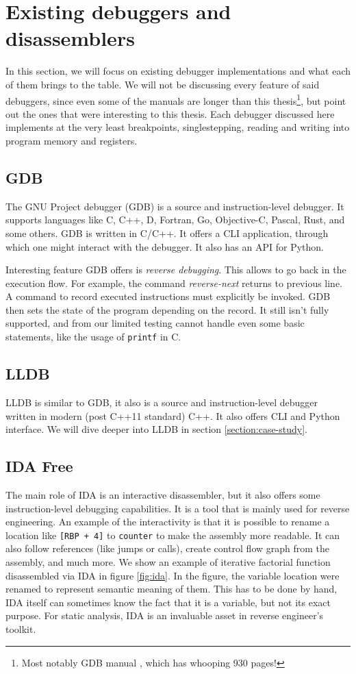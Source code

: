 \section{Existing debuggers and disassemblers}
In this section, we will focus on existing debugger implementations and what
each of them brings to the table. We will not be discussing every feature of
said debuggers, since even some of the manuals are longer than this
thesis\footnote{Most notably GDB manual \cite{gdb-manual}, which has whooping
930 pages!}, but point out the ones that were interesting to this thesis.
Each debugger discussed here implements at the very least breakpoints,
singlestepping, reading and writing into program memory and registers.

\subsection{GDB}
The GNU Project debugger (GDB) \cite{gdb-manual} is a source and instruction-level
debugger. It supports languages like C, C++, D, Fortran, Go, Objective-C,
Pascal, Rust, and some others. GDB is written in C/C++. It offers a CLI
application, through which one might interact with the debugger. It also
has an API for Python.

Interesting feature GDB offers is \textit{reverse debugging}. This allows to go
back in the execution flow. For example, the command \textit{reverse-next}
returns to previous line. A command to record executed instructions must
explicitly be invoked. GDB then sets the state of the program depending on the
record. It still isn't fully supported, and from our limited testing cannot
handle even some basic statements, like the usage of \texttt{printf} in C.

\subsection{LLDB}
LLDB is similar to GDB, it also is a source and instruction-level debugger
written in modern (post C++11 standard) C++. It also offers CLI and Python
interface. We will dive deeper into LLDB in section \ref{section:case-study}.

\subsection{IDA Free}
The main role of IDA is an interactive disassembler, but it also offers some
instruction-level debugging capabilities. It is a tool that is mainly used for
reverse engineering. An example of the interactivity is that it is possible to
rename a location like \texttt{[RBP + 4]} to \texttt{counter} to make the
assembly more readable. It can also follow references (like jumps or calls),
create control flow graph from the assembly, and much more. We show an example
of iterative factorial function disassembled via IDA in figure \ref{fig:ida}.
In the figure, the variable location were renamed to represent semantic meaning
of them. This has to be done by hand, IDA itself can sometimes know the fact
that it is a variable, but not its exact purpose. For static analysis, IDA is
an invaluable asset in reverse engineer's toolkit.

